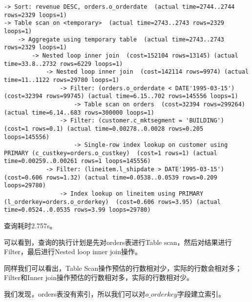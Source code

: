 \documentclass{article}
\begin{document}
\begin{lstlisting}
-> Sort: revenue DESC, orders.o_orderdate  (actual time=2744..2744 rows=2329 loops=1)
-> Table scan on <temporary>  (actual time=2743..2743 rows=2329 loops=1)
    -> Aggregate using temporary table  (actual time=2743..2743 rows=2329 loops=1)
        -> Nested loop inner join  (cost=152104 rows=13145) (actual time=33.8..2732 rows=6229 loops=1)
            -> Nested loop inner join  (cost=142114 rows=9974) (actual time=11..1122 rows=29780 loops=1)
                -> Filter: (orders.o_orderdate < DATE'1995-03-15')  (cost=32394 rows=99745) (actual time=6.15..702 rows=145556 loops=1)
                    -> Table scan on orders  (cost=32394 rows=299264) (actual time=6.14..683 rows=300000 loops=1)
                -> Filter: (customer.c_mktsegment = 'BUILDING')  (cost=1 rows=0.1) (actual time=0.00278..0.0028 rows=0.205 loops=145556)
                    -> Single-row index lookup on customer using PRIMARY (c_custkey=orders.o_custkey)  (cost=1 rows=1) (actual time=0.00259..0.00261 rows=1 loops=145556)
            -> Filter: (lineitem.l_shipdate > DATE'1995-03-15')  (cost=0.606 rows=1.32) (actual time=0.0538..0.0539 rows=0.209 loops=29780)
                -> Index lookup on lineitem using PRIMARY (l_orderkey=orders.o_orderkey)  (cost=0.606 rows=3.95) (actual time=0.0524..0.0535 rows=3.99 loops=29780)
\end{lstlisting}

查询耗时2.757s。

可以看到，查询的执行计划是先对orders表进行Table scan，然后对结果进行Filter，最后进行Nested loop inner join操作。

同样我们可以看出，Table Scan操作预估的行数相对少，实际的行数会相对多；Filter和Inner join操作预估的行数相对多，实际的行数相对少。

我们发现，orders表没有索引，所以我们可以对$o\_orderkey$字段建立索引。
\end{document}
